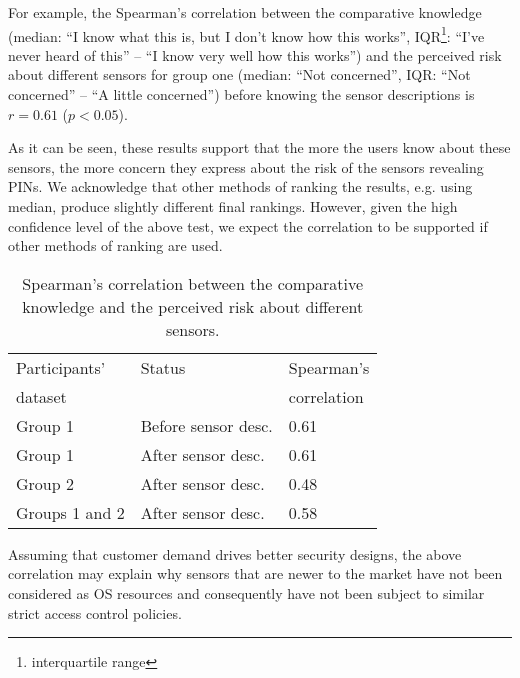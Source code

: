 \documentclass[10pt,twocolumn]{article}
\begin{document}
For example, the Spearman's correlation between the comparative knowledge (median: ``I know what this is, but I don't know how this works'', IQR\footnote{interquartile range}: ``I've never heard of this'' -- ``I know very well how this works'') 
and the perceived risk about different sensors for group one (median: ``Not concerned'', IQR: ``Not concerned'' -- ``A little concerned'') before knowing the sensor descriptions is $r = 0.61$ ($p<0.05$). 

As it can be seen, these results support that the more the users know about these sensors, the more concern they express about the risk of the sensors revealing PINs. 
We acknowledge that other methods of ranking the results, e.g. using median, produce slightly different final rankings. 
However, given the high confidence level of the above test, we expect the correlation to be supported if other methods of ranking are used. 

\begin{table}[t]
\centering
\begin{tabular}{|l|l|l|}
\hline
Participants' & Status & Spearman's \\
 dataset &  & correlation\\
\hline
Group 1& Before sensor desc.& 0.61\\
Group 1& After sensor desc.& 0.61 \\
Group 2& After sensor desc.& 0.48\\
Groups 1 and 2 & After sensor desc. & 0.58 \\
\hline
\end{tabular}
\caption{Spearman's correlation between the comparative knowledge and the perceived risk about different sensors.}
\label{spearman}
\end{table}



Assuming that customer demand drives better security designs, the above correlation may explain why sensors that are newer to the market have not been considered as OS resources and consequently have not been subject to similar strict access control policies. 
\end{document}
